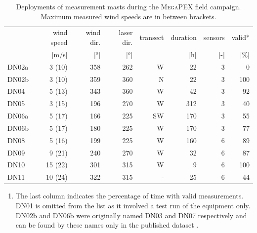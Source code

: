 \begin{table}[h]
  \centering
  \caption{Deployments of measurement masts during the \textsc{MegaPEX} field
    campaign. Maximum measured wind speeds are in between brackets.}
  \label{tab:deployments}
  \begin{tabular}[h]{lrrrrrrr}
    \hline
               & wind speed &  wind dir. & laser dir. &   transect &   duration & sensors &     valid* \\
               &      [m/s] &     [$^o$] &     [$^o$] &            &        [h] &     [-] &       [\%] \\
    \hline
    DN02a      &     3 (10) &        358 &        262 &          W &         22 &       3 &          0 \\
    DN02b      &     3 (10) &        359 &        360 &          N &         22 &       3 &        100 \\
    DN04       &     5 (13) &        343 &        360 &          W &         42 &       3 &         92 \\
    DN05       &     3 (15) &        196 &        270 &          W &        312 &       3 &         40 \\
    DN06a      &     5 (17) &        166 &        225 &         SW &        170 &       3 &         55 \\
    DN06b      &     5 (17) &        180 &        225 &          W &        170 &       3 &         77 \\
    DN08       &     5 (16) &        199 &        225 &          W &        160 &       6 &         89 \\
    DN09       &     9 (21) &        240 &        270 &          W &         32 &       6 &         87 \\
    DN10       &    15 (22) &        301 &        315 &          W &          9 &       6 &        100 \\
    DN11       &    10 (24) &        322 &        315 &          - &         25 &       6 &         44 \\
    \hline
  \end{tabular}

  \footnotesize{
    \begin{enumerate}[{*}]
    \item The last column indicates the percentage of time with
      valid measurements. DN01 is omitted from the list as it
      involved a test run of the equipment only. DN02b and DN06b
      were originally named DN03 and DN07 respectively and can be
      found by these names only in the published dataset
      \citep{megapex}.
    \end{enumerate}}
\end{table}


